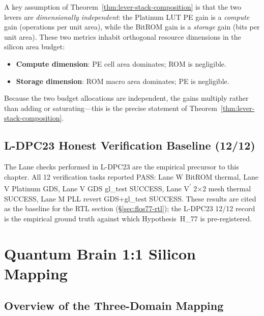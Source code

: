 A key assumption of Theorem~\ref{thm:lever-stack-composition} is that the two levers
are \emph{dimensionally independent}: the Platinum LUT PE gain is a \emph{compute}
gain (operations per unit area), while the BitROM gain is a \emph{storage} gain
(bits per unit area).
These two metrics inhabit orthogonal resource dimensions in the silicon area budget:
\begin{itemize}
  \item \textbf{Compute dimension}: PE cell area dominates; ROM is negligible.
  \item \textbf{Storage dimension}: ROM macro area dominates; PE is negligible.
\end{itemize}
Because the two budget allocations are independent, the gains multiply rather than
adding or saturating---this is the precise statement of
Theorem~\ref{thm:lever-stack-composition}.

\subsection{L-DPC23 Honest Verification Baseline (12/12)}

The Lane checks performed in L-DPC23 are the empirical precursor to this chapter.
All 12 verification tasks reported PASS:
Lane W BitROM thermal, Lane V Platinum GDS, Lane V GDS gl\_test SUCCESS,
Lane V\textsuperscript{$\prime$} 2$\times$2 mesh thermal SUCCESS,
Lane M PLL revert GDS+gl\_test SUCCESS.
These results are cited as the baseline for the RTL section (§\ref{sec:flos77-rtl});
the L-DPC23 12/12 record is the empirical ground truth against which Hypothesis~H\_77
is pre-registered.

\section{Quantum Brain 1:1 Silicon Mapping}
\label{sec:flos77-qbrain}

\subsection{Overview of the Three-Domain Mapping}

